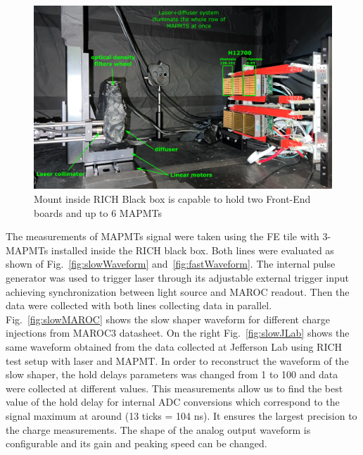 \begin{figure}[hbt]
  \centering
  \includegraphics[width=0.9\linewidth]{figures/LaserSetup.png}
  \caption{Mount inside RICH Black box is capable to hold two Front-End boards and up to 6 MAPMTs}
  \label{fig:FEmount}
\end{figure}


The measurements of MAPMTs signal were taken using the FE tile with 3-MAPMTs installed inside the RICH black box.
Both lines were evaluated as shown of Fig.~\ref{fig:slowWaveform} and~\ref{fig:fastWaveform}.
The internal pulse generator was used to trigger laser through its adjustable external trigger input achieving synchronization between light source and MAROC readout.
Then the data were collected with both lines collecting data in parallel.
Fig.~\ref{fig:slowMAROC} shows the slow shaper waveform for different charge injections from MAROC3 datasheet.
On the right Fig.~\ref{fig:slowJLab} shows the same waveform obtained from the data collected at Jefferson Lab using RICH test setup with laser and MAPMT.
In order to reconstruct the waveform of the slow shaper, the hold delays parameters was changed from 1 to 100 and data were collected at different values.
This measurements allow us to find the best value of the hold delay for internal ADC conversions which correspond to the signal maximum at around (13 ticks = 104 ns).
It ensures the largest precision to the charge measurements.
The shape of the analog output waveform is configurable and its gain and peaking speed can be changed.


